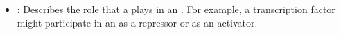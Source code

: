 \begin{description}
\begin{itemize}
\item \emph{}:
Describes the role that a  plays in an .
For example, a transcription factor might participate in an  as a repressor or as an activator.

\end{itemize}


\end{description}